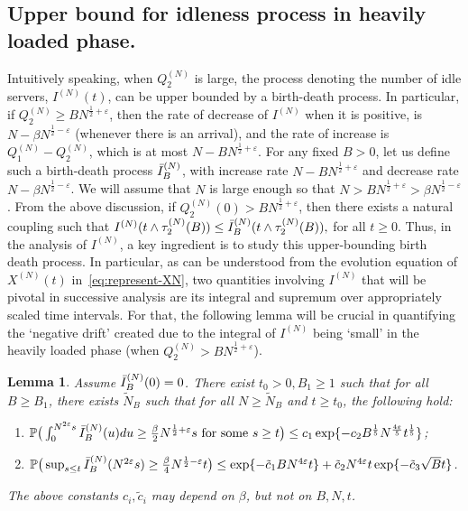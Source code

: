 \documentclass[11pt, reqno]{article}
\newtheorem{lemma}[theorem]{Lemma}
\numberwithin{equation}{section}
\numberwithin{theorem}{section}
\newcommand\blue[1]{#1}
\begin{document}
\subsection{Upper bound for idleness process in heavily loaded phase.}\label{idlesec}
Intuitively speaking, when $Q_2^{(N)}$ is large, the process denoting the number of idle servers, $I^{(N)}(t)$, can be upper bounded by a birth-death process.
In particular, if $Q_2^{(N)}\geq BN^{\frac{1}{2}+\varepsilon}$, then the rate of decrease of $I^{(N)}$ when it is positive, is $N-\beta N^{\frac{1}{2}-\varepsilon}$ (whenever there is an arrival), and the rate of increase is $Q_1^{(N)}-Q_2^{(N)}$, which is at most $N-BN^{\frac{1}{2}+\varepsilon}$.
For any fixed $B>0$, let us define such a birth-death process $\Bar{I}^{(N)}_B$,  with  
 increase rate $N-BN^{\frac{1}{2}+\varepsilon}$ and decrease rate $N-\beta N^{\frac{1}{2}-\varepsilon}$.
We will assume that $N$ is large enough so that $N>BN^{\frac{1}{2}+\varepsilon}>\beta N^{\frac{1}{2}-\varepsilon}$.
From the above discussion, if $Q^{(N)}_2(0)>BN^{\frac{1}{2}+\varepsilon}$, then there exists a natural coupling such that
$
    I^{(N)}(t\wedge \tau^{(N)}_2(B))\leq \Bar{I}^{(N)}_B(t\wedge \tau^{(N)}_2(B)),
$
for all $t\geq 0$. 
Thus, in the analysis of $I^{(N)}$, a key ingredient is to study this upper-bounding birth death process. 
In particular, as can be understood from the evolution equation of $X^{(N)}(t)$ in~\eqref{eq:represent-XN}, two quantities involving $I^{(N)}$ that will be pivotal in successive analysis are its integral and supremum over appropriately scaled time intervals.
For that, the following lemma will be \blue{crucial in quantifying the `negative drift' created due to the integral of $I^{(N)}$ being `small' in the heavily loaded phase (when $Q^{(N)}_2 > B N^{\frac{1}{2}+\varepsilon}$).}
\begin{lemma}\label{lem:LEMMA-6}
Assume $\Bar{I}^{(N)}_B(0)=0$.  There exist $t_0>0,B_1 \ge 1$ such that for all $B\geq B_1$, \blue{there exists $\tilde N_B$ such that for all} $N\geq \tilde N_B$ and $t\geq t_0$, the following hold: \begin{enumerate}[\normalfont (i)]
    \item \label{7i}$\mathbb{P}\big(\int_0^{N^{2\varepsilon}s}\Bar{I}_B^{(N)}(u)du \ge \frac{\beta}{2} N^{\frac{1}{2}+\varepsilon}s\text{ for some }s\geq t\big)\leq c_1\exp \{-c_2 B^{\frac{1}{5}} N^{\frac{4\varepsilon}{5}}t^{\frac{1}{5}}\}$;
    \item \label{7ii} $\mathbb{P}\big(\sup_{s\leq t}\Bar{I}_B^{(N)}(N^{2\varepsilon}s)\geq \frac{\beta}{4}N^{\frac{1}{2}-\varepsilon}t\big)\leq \exp \{-\tilde{c}_1 B N^{4\varepsilon}t\}+\tilde{c}_2N^{4\varepsilon}t \exp \{-\tilde{c}_3 \sqrt{B} t\}$.
\end{enumerate}
The above constants $c_i,\tilde{c}_i$ may depend on $\beta$, but not on $B,N,t$.
\end{lemma}
\end{document}
